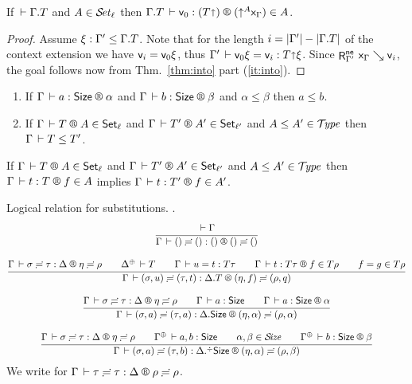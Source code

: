 \documentclass[acmlarge,review,anonymous]{acmart}\settopmatter{printfolios=true}
\begin{document}
\begin{corollary}
  \label{cor:fresh}
  If $\der \cext \Gamma T$ and $A \in \SET[\ell]$
  then $\LR {\cext \Gamma T} {\ind 0} {(T \slift)} {(\up A \var\Gamma)} A$.
\end{corollary}
\begin{proof}
  Assume $\xi : \Gamma' \leq \cext \Gamma T$.
  Note that for the length
  $i = |\Gamma'| - |\cext \Gamma T|$ of the context extension
  we have $\ind i = \ind 0 \xi$, thus
  $\Gamma' \der \ind 0 \xi = \ind i : T \slift \xi$.
  Since $\RNe{\Gamma'} {\var\Gamma} {\ind i}$,
  the goal follows now from Thm.~\ref{thm:into} part (\ref{it:into}).
\end{proof}


\begin{lemma}
\bla
\begin{enumerate}
\item
   If $\LRSize \Gamma a \alpha$ and $\LRSize \Gamma {b} \beta$ and $\alpha \leq \beta$ then $a \leq b$.
\item
   If $\LRT \Gamma T A \ell$ and $\LRT \Gamma {T'} {A'} {\ell'}$ and $A \leq A' \in \TYPE$ then $\Gamma \der T \leq T'$.
\end{enumerate}
\end{lemma}


\begin{lemma}
   If $\LRT \Gamma T A \ell$ and $\LRT \Gamma {T'} {A'} {\ell'}$ and $A \leq A' \in \TYPE$ then
   $\LR \Gamma t T f A$ implies $\LR \Gamma t {T'} f {A'}$.
\end{lemma}


Logical relation for substitutions.
\fbox{$\LRSub \Gamma \sigma \tau \Delta \eta \rho$}.
\begin{gather*}
  \ru{\der \Gamma
    }{\LRSub \Gamma {\sempty} {\sempty} {\cempty} {\sempty} {\sempty}}
\\[2ex]
  \ru{\LRSub \Gamma \sigma \tau \Delta \eta \rho \qquad
      \resurrect \Delta \der T \qquad
      \Gamma \der u = t : T\tau \qquad
      \LR \Gamma t {T \tau} f {T \rho} \qquad
      f = g \in T\rho
    }{\LRSub \Gamma {(\sigma,u)} {(\tau,t)} {\cext \Delta T} {(\eta,f)} {(\rho,q)}}
\\[2ex]
  \ru{\LRSub \Gamma \sigma \tau \Delta \eta \rho \qquad
      \Gamma \der a : \Size \qquad
      \LRSize \Gamma a \alpha
    }{\LRSub \Gamma {(\sigma,a)} {(\tau,a)} {\cext \Delta \Size} {(\eta,\alpha)} {(\rho,\alpha)}}
\\[2ex]
  \ru{\LRSub \Gamma \sigma \tau \Delta \eta \rho \qquad
      \resurrect \Gamma \der a, b : \Size \qquad
      \alpha,\beta \in \SIZE \qquad
      \LRSize {\resurrect\Gamma} b \beta
    }{\LRSub \Gamma {(\sigma,a)} {(\tau,b)} {\erext \Delta \Size} {(\eta,\alpha)} {(\rho,\beta)}}
\end{gather*}
We write \fbox{$\LRS \Gamma \tau \Delta \rho$} for $\LRSub \Gamma \tau \tau \Delta \rho \rho$.
\end{document}
